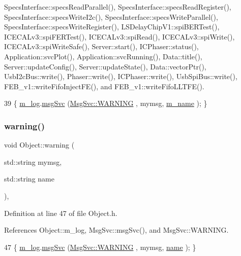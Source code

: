 Specs\+Interface\+::specs\+Read\+Parallel(), Specs\+Interface\+::specs\+Read\+Register(), Specs\+Interface\+::specs\+Write\+I2c(), Specs\+Interface\+::specs\+Write\+Parallel(), Specs\+Interface\+::specs\+Write\+Register(), L\+S\+Delay\+Chip\+V1\+::spi\+B\+E\+R\+Test(), I\+C\+E\+C\+A\+Lv3\+::spi\+F\+E\+R\+Test(), I\+C\+E\+C\+A\+Lv3\+::spi\+Read(), I\+C\+E\+C\+A\+Lv3\+::spi\+Write(), I\+C\+E\+C\+A\+Lv3\+::spi\+Write\+Safe(), Server\+::start(), I\+C\+Phaser\+::status(), Application\+::svc\+Plot(), Application\+::svc\+Running(), Data\+::title(), Server\+::update\+Config(), Server\+::update\+State(), Data\+::vector\+Ptr(), Usb\+I2c\+Bus\+::write(), Phaser\+::write(), I\+C\+Phaser\+::write(), Usb\+Spi\+Bus\+::write(), F\+E\+B\+\_\+v1\+::write\+Fifo\+Inject\+F\+E(), and F\+E\+B\+\_\+v1\+::write\+Fifo\+L\+L\+T\+F\+E().


\begin{DoxyCode}
39 \{ \hyperlink{classObject_a0d269813dd7ac1f24bc143031e2963f2}{m\_log}.\hyperlink{classMsgSvc_ad25f18047920cc59a314e5098259711c}{msgSvc} (\hyperlink{classMsgSvc_ae671eb7301996cd049d2da8a65925926a7cefae88f2ba26b2b05b676a383c834b}{MsgSvc::WARNING} , mymsg, \hyperlink{classObject_a8b83c95c705d2c3ba0d081fe1710f48d}{m\_name} ); \}
\end{DoxyCode}
\mbox{\label{classObject_a11f101db4dd73d9391b0231818881d86}} 
\subsubsection{\texorpdfstring{warning()}{warning()}\hspace{0.1cm}{\footnotesize\ttfamily [2/2]}}
{\footnotesize\ttfamily void Object\+::warning (\begin{DoxyParamCaption}\item[{std\+::string}]{mymsg,  }\item[{std\+::string}]{name }\end{DoxyParamCaption})\hspace{0.3cm}{\ttfamily [inline]}, {\ttfamily [inherited]}}



Definition at line 47 of file Object.\+h.



References Object\+::m\+\_\+log, Msg\+Svc\+::msg\+Svc(), and Msg\+Svc\+::\+W\+A\+R\+N\+I\+NG.


\begin{DoxyCode}
47 \{ \hyperlink{classObject_a0d269813dd7ac1f24bc143031e2963f2}{m\_log}.\hyperlink{classMsgSvc_ad25f18047920cc59a314e5098259711c}{msgSvc} (\hyperlink{classMsgSvc_ae671eb7301996cd049d2da8a65925926a7cefae88f2ba26b2b05b676a383c834b}{MsgSvc::WARNING} , mymsg, \hyperlink{classObject_a300f4c05dd468c7bb8b3c968868443c1}{name} ); \}
\end{DoxyCode}


